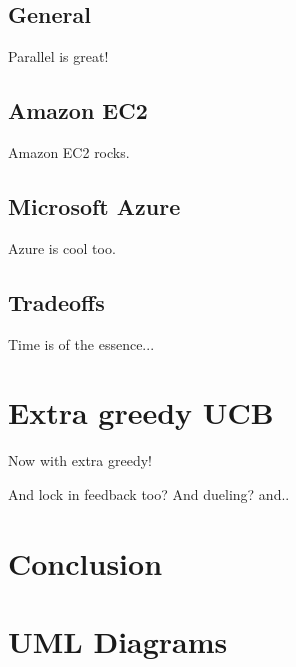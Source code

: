 \documentclass{jss}\usepackage[]{graphicx}\usepackage[]{color}
\begin{document}
\subsection{General}

Parallel is great!

\subsection{Amazon EC2}

Amazon EC2 rocks.

\subsection{Microsoft Azure}

Azure is cool too.

\subsection{Tradeoffs}

Time is of the essence...

\section{Extra greedy UCB}

Now with extra greedy!

And lock in feedback too? And dueling? and..

\section{Conclusion}
\label{sec:conc4}

\section{UML Diagrams}
\end{document}
